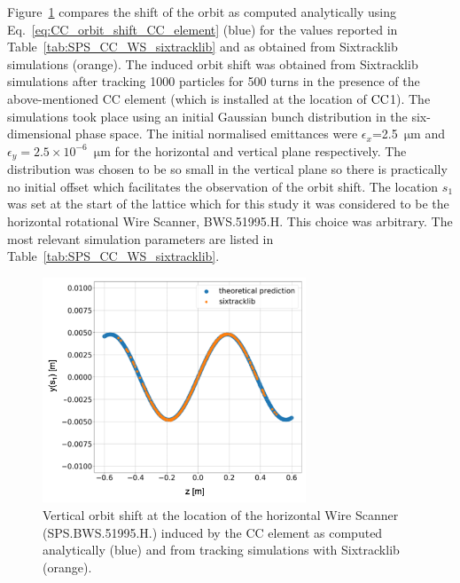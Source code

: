 Figure~\ref{fig:sixtracklib_CC_orbit_shift_vs_theory} compares the shift of the orbit as computed analytically using Eq.~\eqref{eq:CC_orbit_shift_CC_element} (blue) for the values reported in Table~\ref{tab:SPS_CC_WS_sixtracklib} and as obtained from Sixtracklib simulations (orange). The induced orbit shift was obtained from Sixtracklib simulations after tracking 1000 particles for 500 turns in the presence of the above-mentioned CC element (which is installed at the location of ${\mathrm{CC}}$1). The simulations took place using an initial Gaussian bunch distribution in the six-dimensional phase space. The initial normalised emittances were $\epsilon_x$=2.5\, $\mathrm{\mu m}$ and $\epsilon_y=2.5 \times 10^{-6}$\, $\mathrm{\mu m}$ for the horizontal and vertical plane respectively. The distribution was chosen to be so small in the vertical plane so there is practically no initial offset which facilitates the observation of the orbit shift. %
The location $s_1$ was set at the start of the lattice which for this study it was considered to be the horizontal rotational Wire Scanner, BWS.51995.H. This choice was arbitrary. The most relevant simulation parameters are listed in Table~\ref{tab:SPS_CC_WS_sixtracklib}.


\begin{figure}[!h]
    \centering         
    \includegraphics[width=0.7\textwidth]{images/Ch6/Vcc_orbit_shfit_sixtracklib_sanity_check.png}
        \caption{Vertical orbit shift at the location of the horizontal Wire Scanner (SPS.BWS.51995.H.) induced by the CC element as computed analytically (blue) and from tracking simulations with Sixtracklib (orange).}
        \label{fig:sixtracklib_CC_orbit_shift_vs_theory}
\end{figure}

